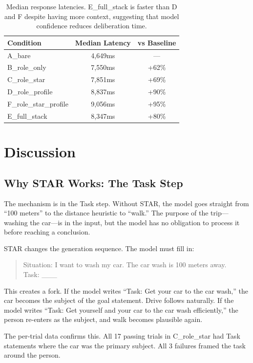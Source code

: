 \documentclass[11pt]{article}
\begin{document}
\begin{table}[H]
\centering
\begin{tabular}{lcc}
\toprule
\textbf{Condition} & \textbf{Median Latency} & \textbf{vs Baseline} \\
\midrule
A\_bare & 4,649ms & --- \\
B\_role\_only & 7,550ms & +62\% \\
C\_role\_star & 7,851ms & +69\% \\
D\_role\_profile & 8,837ms & +90\% \\
F\_role\_star\_profile & 9,056ms & +95\% \\
E\_full\_stack & 8,347ms & +80\% \\
\bottomrule
\end{tabular}
\caption{Median response latencies. E\_full\_stack is faster than D and F despite having more context, suggesting that model confidence reduces deliberation time.}
\label{tab:latency}
\end{table}

\section{Discussion}

\subsection{Why STAR Works: The Task Step}
\label{sec:why_star}

The mechanism is in the Task step. Without STAR, the model goes straight from ``100 meters'' to the distance heuristic to ``walk.'' The purpose of the trip---washing the car---is in the input, but the model has no obligation to process it before reaching a conclusion.

STAR changes the generation sequence. The model must fill in:

\begin{quote}
Situation: I want to wash my car. The car wash is 100 meters away.\\
Task: \_\_\_
\end{quote}

This creates a fork. If the model writes ``Task: Get your car to the car wash,'' the car becomes the subject of the goal statement. Drive follows naturally. If the model writes ``Task: Get yourself and your car to the car wash efficiently,'' the person re-enters as the subject, and walk becomes plausible again.

The per-trial data confirms this. All 17 passing trials in C\_role\_star had Task statements where the car was the primary subject. All 3 failures framed the task around the person.
\end{document}
